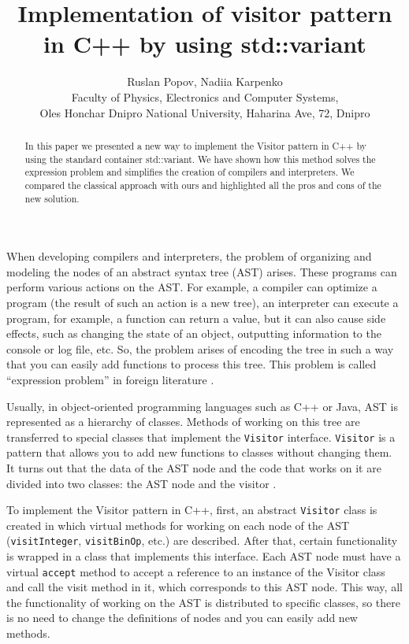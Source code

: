 \documentclass[a4paper, 12pt]{article}
\title{Implementation of visitor pattern in C++ by using std::variant}
\author{Ruslan Popov, Nadiia Karpenko \\
	\small Faculty of Physics, Electronics and Computer Systems, \\
	Oles Honchar Dnipro National University, Haharina Ave, 72, Dnipro}
\date{}
\begin{document}
	\maketitle
	
	\begin{abstract}
		In this paper we presented a new way to implement the Visitor pattern in C++ by using the standard container std::variant. We have shown how this method solves the expression problem and simplifies the creation of compilers and interpreters. We compared the classical approach with ours and highlighted all the pros and cons of the new solution.
	\end{abstract}
	
	When developing compilers and interpreters, the problem of organizing and modeling the nodes of an abstract syntax tree (AST) arises. These programs can perform various actions on the AST. For example, a compiler can optimize a program (the result of such an action is a new tree), an interpreter can execute a program, for example, a function can return a value, but it can also cause side effects, such as changing the state of an object, outputting information to the console or log file, etc. So, the problem arises of encoding the tree in such a way that you can easily add functions to process this tree. This problem is called \enquote{expression problem} in foreign literature \cite{expr_prob}.
	
	Usually, in object-oriented programming languages such as C++ or Java, AST is represented as a hierarchy of classes. Methods of working on this tree are transferred to special classes that implement the \texttt{Visitor} interface. \texttt{Visitor} is a pattern that allows you to add new functions to classes without changing them. It turns out that the data of the AST node and the code that works on it are divided into two classes: the AST node and the visitor \cite{visitor}.
	
	To implement the Visitor pattern in C++, first, an abstract \texttt{Visitor} class is created in which virtual methods for working on each node of the AST (\texttt{visitInteger}, \texttt{visitBinOp}, etc.) are described. After that, certain functionality is wrapped in a class that implements this interface. Each AST node must have a virtual \texttt{accept} method to accept a reference to an instance of the Visitor class and call the visit method in it, which corresponds to this AST node. This way, all the functionality of working on the AST is distributed to specific classes, so there is no need to change the definitions of nodes and you can easily add new methods.
	
\end{document}
